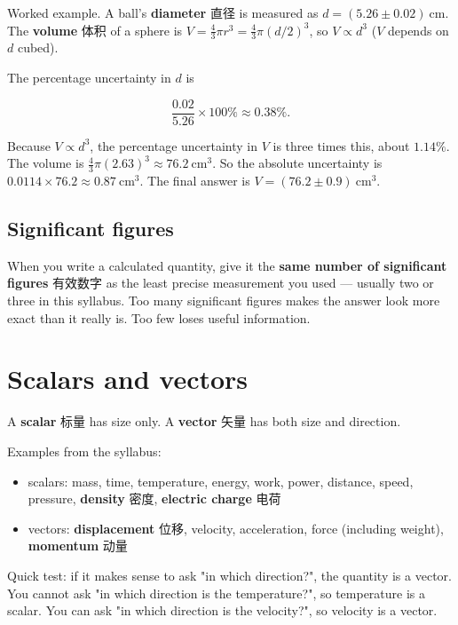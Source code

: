 \documentclass[11pt]{article}
\begin{document}
Worked example. A ball's \textbf{diameter} 直径 is measured as $d = (5.26 \pm 0.02)\ \text{cm}$. The \textbf{volume} 体积 of a sphere is $V = \tfrac{4}{3}\pi r^{3} = \tfrac{4}{3}\pi (d/2)^{3}$, so $V \propto d^{3}$ ($V$ depends on $d$ cubed).

The percentage uncertainty in $d$ is

\[
\frac{0.02}{5.26} \times 100\% \approx 0.38\%.
\]

Because $V \propto d^{3}$, the percentage uncertainty in $V$ is three times this, about $1.14\%$. The volume is $\tfrac{4}{3}\pi(2.63)^{3} \approx 76.2\ \text{cm}^{3}$. So the absolute uncertainty is $0.0114 \times 76.2 \approx 0.87\ \text{cm}^{3}$. The final answer is $V = (76.2 \pm 0.9)\ \text{cm}^{3}$.

\subsection*{Significant figures}

When you write a calculated quantity, give it the \textbf{same number of significant figures} 有效数字 as the least precise measurement you used — usually two or three in this syllabus. Too many significant figures makes the answer look more exact than it really is. Too few loses useful information.

\section*{Scalars and vectors}

A \textbf{scalar} 标量 has size only. A \textbf{vector} 矢量 has both size and direction.

Examples from the syllabus:

\begin{itemize}
\item scalars: mass, time, temperature, energy, work, power, distance, speed, pressure, \textbf{density} 密度, \textbf{electric charge} 电荷

\item vectors: \textbf{displacement} 位移, velocity, acceleration, force (including weight), \textbf{momentum} 动量

\end{itemize}

Quick test: if it makes sense to ask "in which direction?", the quantity is a vector. You cannot ask "in which direction is the temperature?", so temperature is a scalar. You can ask "in which direction is the velocity?", so velocity is a vector.
\end{document}
